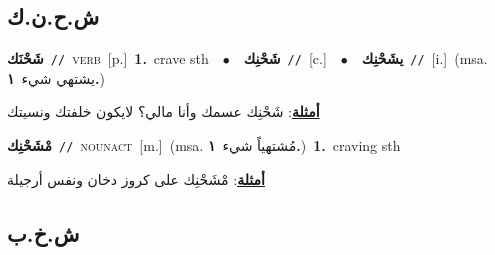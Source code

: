 \documentclass[10pt,a4paper,twoside]{article} %
\begin{document}
\begin{multicols}{2}
\vspace{-3mm}
\subsection*{\color{blue}\foreignlanguage{arabic}{ش.ح.ن.ك}\color{blue}{}} 

{\setlength\topsep{0pt}\textbf{\foreignlanguage{arabic}{شَحْنَك}}\ {\color{gray}\texttt{//}\color{black}}\ \textsc{verb}\ [p.]\ \textbf{1.}~crave sth\ \ $\bullet$\ \ \setlength\topsep{0pt}\textbf{\foreignlanguage{arabic}{شَحْنِك}}\ {\color{gray}\texttt{//}\color{black}}\ [c.]\ \ $\bullet$\ \ \setlength\topsep{0pt}\textbf{\foreignlanguage{arabic}{يشَحْنِك}}\ {\color{gray}\texttt{//}\color{black}}\ [i.]\ \color{gray}(msa. \foreignlanguage{arabic}{يشتهي شيء}~\foreignlanguage{arabic}{\textbf{١.}})\color{black}\  \begin{flushright}\color{gray}\foreignlanguage{arabic}{\textbf{\underline{\foreignlanguage{arabic}{أمثلة}}}: شَحْنِك عسمك وأنا مالي؟ لايكون خلفتك ونسيتك}\end{flushright}\color{black}} \vspace{2mm}

{\setlength\topsep{0pt}\textbf{\foreignlanguage{arabic}{مْشَحْنِك}}\ {\color{gray}\texttt{//}\color{black}}\ \textsc{noun\textunderscore act}\ [m.]\ \color{gray}(msa. \foreignlanguage{arabic}{مُشتهياً شيء}~\foreignlanguage{arabic}{\textbf{١.}})\color{black}\ \textbf{1.}~craving sth\  \begin{flushright}\color{gray}\foreignlanguage{arabic}{\textbf{\underline{\foreignlanguage{arabic}{أمثلة}}}: مْشَحْنِك على كروز دخان ونفس أرجيلة}\end{flushright}\color{black}} \vspace{2mm}

\vspace{-3mm}
\subsection*{\color{blue}\foreignlanguage{arabic}{ش.خ.ب}\color{blue}{}} 


\end{multicols}
\end{document}
